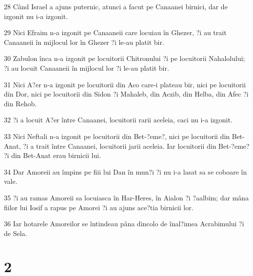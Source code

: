 \par 28 Când Israel a ajuns puternic, atunci a facut pe Canaanei birnici, dar de izgonit nu i-a izgonit.
\par 29 Nici Efraim n-a izgonit pe Canaaneii care locuiau în Ghezer, ?i au trait Canaaneii în mijlocul lor în Ghezer ?i le-au platit bir.
\par 30 Zabulon înca n-a izgonit pe locuitorii Chitronului ?i pe locuitorii Nahalolului; ?i au locuit Canaaneii în mijlocul lor ?i le-au platit bir.
\par 31 Nici A?er n-a izgonit pe locuitorii din Aco care-i plateau bir, nici pe locuitorii din Dor, nici pe locuitorii din Sidon ?i Mahaleb, din Aczib, din Helba, din Afec ?i din Rehob.
\par 32 ?i a locuit A?er între Canaanei, locuitorii rarii aceleia, caci nu i-a izgonit.
\par 33 Nici Neftali n-a izgonit pe locuitorii din Bet-?eme?, nici pe locuitorii din Bet-Anat, ?i a trait între Canaanei, locuitorii jarii aceleia. Iar locuitorii din Bet-?eme? ?i din Bet-Anat erau birnicii lui.
\par 34 Dar Amoreii au împins pe fiii lui Dan în mun?i ?i nu i-a lasat sa se coboare în vale.
\par 35 ?i au ramas Amoreii sa locuiasca în Har-Heres, în Aialon ?i ?aalbim; dar mâna fiilor lui Iosif a rapus pe Amorei ?i au ajuns ace?tia birnicii lor.
\par 36 Iar hotarele Amoreilor se întindeau pâna dincolo de înal?imea Acrabimului ?i de Sela.

\chapter{2}

